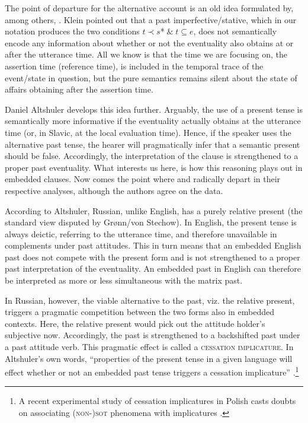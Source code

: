 \documentclass[output=paper,colorlinks,citecolor=brown]{langscibook}
\begin{document}
 The point of departure for the alternative account is an old idea formulated by, among others, \citet{Klein1995}.
Klein pointed out that a past imperfective/stative, which in our notation produces the two conditions $t \prec s$*$ \; \& \; t \subseteq e$, does not semantically encode any information about whether or not the eventuality also obtains at or after the utterance time. All we know is that the time we are focusing on, the assertion time (reference time), is included in the temporal trace of the event/state in question, but the pure semantics remains silent about the state of affairs obtaining after the assertion time. 

Daniel Altshuler develops this idea further. Arguably, the use of a present tense is semantically more informative if the eventuality actually obtains at the utterance time (or, in Slavic, at the local evaluation time). Hence, if the speaker uses the alternative past tense, the hearer will pragmatically infer that a semantic present should be false. Accordingly, the interpretation of the clause is strengthened to a proper past eventuality. What interests us here, is how this reasoning plays out in embedded clauses.
Now comes the point where \citet{Altshuler16} and \citet{gronn_stechow2012} radically depart in their respective analyses, although the authors agree on the data.

According to Altshuler, Russian, unlike English, has a purely relative present (the standard view disputed by Grønn/von Stechow). In English, the present tense is always deictic, referring to the utterance time, and therefore unavailable in complements under past attitudes. This in turn means that an embedded English past does not compete with the present form and is not strengthened to a proper past interpretation of the eventuality. An embedded past in English can therefore be interpreted as more or less simultaneous with the matrix past.

In Russian, however,  the viable alternative to the past, viz. the relative present, triggers a pragmatic competition between the two forms also in embedded contexts. Here, the relative present  would pick out the attitude holder's subjective now. Accordingly, the past is strengthened to a backshifted past under a past attitude verb. This pragmatic effect is called a \textsc{cessation} \textsc{implicature}. In Altshuler's own words, ``properties of the present tense in a given language will effect whether or not an embedded
past tense triggers a cessation implicature” \citep[135f.]{Altshuler16}.\footnote{A recent experimental study of cessation implicatures in Polish 
casts doubts on associating \textsc{(non-)sot} phenomena with implicatures \citep{mucha2023}. 
}
\end{document}
